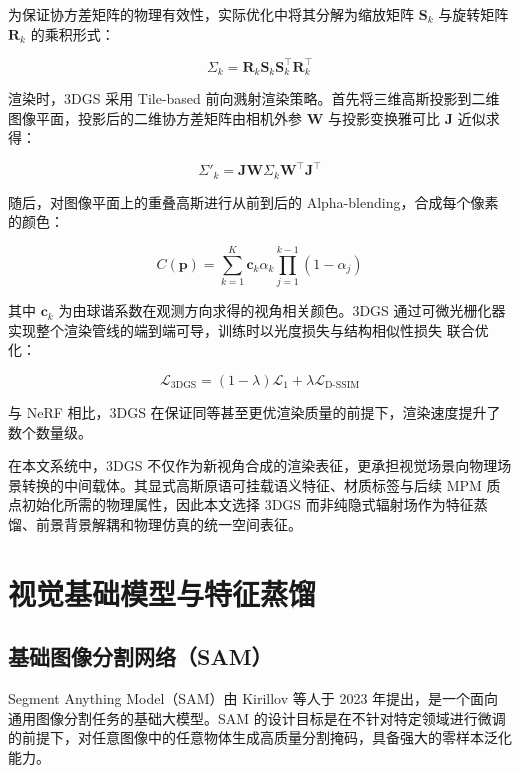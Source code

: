 为保证协方差矩阵的物理有效性，实际优化中将其分解为缩放矩阵 $\mathbf{S}_k$ 与旋转矩阵 $\mathbf{R}_k$ 的乘积形式：

\begin{equation}
\Sigma_k = \mathbf{R}_k \mathbf{S}_k \mathbf{S}_k^\top \mathbf{R}_k^\top
\end{equation}

渲染时，3DGS 采用 Tile-based 前向溅射渲染策略。首先将三维高斯投影到二维图像平面，投影后的二维协方差矩阵由相机外参 $\mathbf{W}$ 与投影变换雅可比 $\mathbf{J}$ 近似求得：

\begin{equation}
\Sigma'_k = \mathbf{J} \mathbf{W} \Sigma_k \mathbf{W}^\top \mathbf{J}^\top
\end{equation}

随后，对图像平面上的重叠高斯进行从前到后的 Alpha-blending，合成每个像素的颜色：

\begin{equation}
C(\mathbf{p}) = \sum_{k=1}^{K} \mathbf{c}_k \alpha_k \prod_{j=1}^{k-1} (1 - \alpha_j)
\end{equation}

其中 $\mathbf{c}_k$ 为由球谐系数在观测方向求得的视角相关颜色。3DGS 通过可微光栅化器实现整个渲染管线的端到端可导，训练时以光度损失与结构相似性损失\cite{ssim} 联合优化：

\begin{equation}
\mathcal{L}_{\text{3DGS}} = (1 - \lambda) \mathcal{L}_1 + \lambda \mathcal{L}_{\text{D-SSIM}}
\end{equation}

与 NeRF 相比，3DGS 在保证同等甚至更优渲染质量的前提下，渲染速度提升了数个数量级。

在本文系统中，3DGS 不仅作为新视角合成的渲染表征，更承担视觉场景向物理场景转换的中间载体。其显式高斯原语可挂载语义特征、材质标签与后续 MPM 质点初始化所需的物理属性，因此本文选择 3DGS 而非纯隐式辐射场作为特征蒸馏、前景背景解耦和物理仿真的统一空间表征。

\section{视觉基础模型与特征蒸馏}

\subsection{基础图像分割网络（SAM）}

Segment Anything Model（SAM）由 Kirillov 等人于 2023 年提出\cite{sam}，是一个面向通用图像分割任务的基础大模型。SAM 的设计目标是在不针对特定领域进行微调的前提下，对任意图像中的任意物体生成高质量分割掩码，具备强大的零样本泛化能力。

